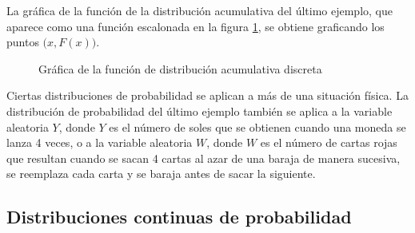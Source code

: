 La gráfica de la función de la distribución acumulativa del último ejemplo, que aparece
como una función escalonada en la figura \ref{fig:distribucion_acumulativa}, se obtiene graficando los puntos $\big(x, F(x)\big)$.
\begin{figure}[h!]
    \centering
    \caption{Gráfica de la función de distribución acumulativa discreta}
    \label{fig:distribucion_acumulativa}
\end{figure}

Ciertas distribuciones de probabilidad se aplican a más de una situación física. La distribución de probabilidad del último ejemplo también se aplica a la variable aleatoria $Y$, donde $Y$ es el número de soles que se obtienen cuando una moneda se lanza 4 veces, o a la variable aleatoria $W$, donde $W$ es el número de cartas rojas que resultan cuando se sacan 4 cartas al azar de una baraja de manera sucesiva, se reemplaza cada carta y se baraja antes de sacar la siguiente.

\subsection*{Distribuciones continuas de probabilidad}

